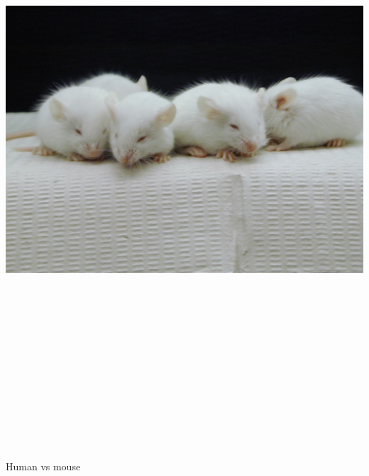\documentclass[12pt]{article}
\newcommand{\headsize}{\fontsize{35}{35} \selectfont}
\begin{document}
\centerline{\includegraphics[height=9in]{FigsA/inbredmice.jpg}}


\newpage

\headsize \color{myyellow}
\hfill \begin{minipage}{5.75in}
\centering
Human vs mouse
\end{minipage}

\vspace{3cm}
\end{document}
